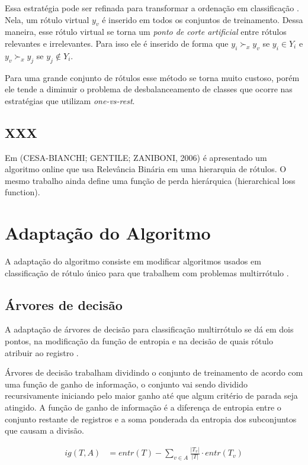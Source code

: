 \documentclass[runningheads,a4paper]{llncs}
\begin{document}
Essa estratégia pode ser refinada para transformar a ordenação em classificação \cite{Furnkranz2008-rf}. Nela, um rótulo virtual $y_v$ é inserido em todos os conjuntos de treinamento. Dessa maneira, esse rótulo virtual se torna um \textit{ponto de corte artificial} entre rótulos relevantes e irrelevantes. Para isso ele é inserido de forma que $y_i \succ_x y_v$ se $y_i \in Y_i$ e $y_v \succ_x y_j$ se $y_j \notin Y_i$.

Para uma grande conjunto de rótulos esse método se torna muito custoso, porém ele tende a diminuir o problema de desbalanceamento de classes que ocorre nas estratégias que utilizam \textit{one-vs-rest}.

\subsection{XXX}

Em (CESA-BIANCHI; GENTILE; ZANIBONI, 2006) \cite{Cesa-Bianchi2006-fk} é apresentado um algoritmo online que usa Relevância Binária em uma hierarquia de rótulos. O mesmo trabalho ainda define uma função de perda hierárquica (hierarchical loss function).

\section{Adaptação do Algoritmo}\label{sec:adaptacao}

A adaptação do algoritmo consiste em modificar algoritmos usados em classificação de rótulo único para que trabalhem com problemas multirrótulo \cite{Tsoumakas2007-cw}.

\subsection{Árvores de decisão}

A adaptação de árvores de decisão para classificação multirrótulo se dá em dois pontos, na modificação da função de entropia e na decisão de quais rótulo atribuir ao registro \cite{Clare2001-tq}.

Árvores de decisão trabalham dividindo o conjunto de treinamento de acordo com uma função de ganho de informação, o conjunto vai sendo dividido recursivamente iniciando pelo maior ganho até que algum critério de parada seja atingido. A função de ganho de informação é a diferença de entropia entre o conjunto restante de registros e a soma ponderada da entropia dos subconjuntos que causam a divisão.

\begin{align*}
	ig(T, A) &= entr(T) - \sum_{v \in A} \frac{|T_v|}{|T|} \cdot entr(T_v)
\end{align*}
\end{document}
